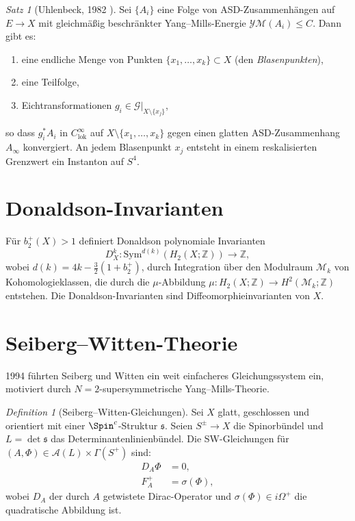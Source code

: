 \documentclass[12pt,a4paper]{amsart}
\theoremstyle{definition}
\theoremstyle{remark}
\newtheorem{satz}[theorem]{Satz}
\newtheorem{definition_de}[theorem]{Definition}
\newcommand{\ZZ}{\mathbb{Z}}
\begin{document}
\begin{satz}[Uhlenbeck, 1982 \cite{Uhlenbeck1982}]
Sei $\{A_i\}$ eine Folge von ASD-Zusammenhängen auf $E \to X$ mit gleichmäßig
beschränkter Yang--Mills-Energie $\mathcal{YM}(A_i) \le C$.  Dann gibt es:
\begin{enumerate}[label=(\roman*)]
  \item eine endliche Menge von Punkten $\{x_1,\ldots,x_k\} \subset X$
        (den \emph{Blasenpunkten}),
  \item eine Teilfolge,
  \item Eichtransformationen $g_i \in \mathcal{G}|_{X \setminus \{x_j\}}$,
\end{enumerate}
so dass $g_i^* A_i$ in $C^\infty_{\mathrm{lok}}$ auf
$X \setminus \{x_1,\ldots,x_k\}$ gegen einen glatten ASD-Zusammenhang
$A_\infty$ konvergiert.  An jedem Blasenpunkt $x_j$ entsteht in einem
reskalisierten Grenzwert ein Instanton auf $S^4$.
\end{satz}

\section{Donaldson-Invarianten}

Für $b_2^+(X) > 1$ definiert Donaldson polynomiale Invarianten
\[
  D_X^k \colon \mathrm{Sym}^{d(k)}(H_2(X;\ZZ)) \longrightarrow \ZZ,
\]
wobei $d(k) = 4k - \tfrac{3}{2}(1 + b_2^+)$,
durch Integration über den Modulraum $\mathcal{M}_k$ von Kohomologieklassen,
die durch die $\mu$-Abbildung $\mu \colon H_2(X;\ZZ) \to H^2(\mathcal{M}_k;\ZZ)$
entstehen.  Die Donaldson-Invarianten sind Diffeomorphieinvarianten von $X$.

\section{Seiberg--Witten-Theorie}

1994 führten Seiberg und Witten \cite{SeibergWitten1994} ein weit einfacheres
Gleichungssystem ein, motiviert durch $N{=}2$-supersymmetrische
Yang--Mills-Theorie.

\begin{definition_de}[Seiberg--Witten-Gleichungen]
Sei $X$ glatt, geschlossen und orientiert mit einer $\Spin^c$-Struktur
$\mathfrak{s}$.  Seien $S^\pm \to X$ die Spinorbündel und $L = \det\mathfrak{s}$
das Determinantenlinienbündel.  Die SW-Gleichungen für
$(A,\Phi) \in \mathcal{A}(L) \times \Gamma(S^+)$ sind:
\begin{align}
  D_A \Phi &= 0,\\
  F_A^+ &= \sigma(\Phi),
\end{align}
wobei $D_A$ der durch $A$ getwistete Dirac-Operator und
$\sigma(\Phi) \in i\Omega^+$ die quadratische Abbildung ist.
\end{definition_de}
\end{document}
